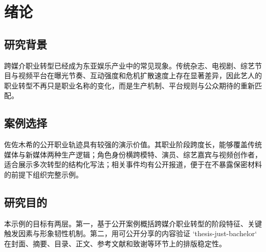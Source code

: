 \chapter{绪论}

\section{研究背景}

跨媒介职业转型已经成为东亚娱乐产业中的常见现象。传统杂志、电视剧、综艺节目与视频平台在曝光节奏、互动强度和危机扩散速度上存在显著差异，因此艺人的职业转型不再只是职业名称的变化，而是生产机制、平台规则与公众期待的重新匹配。

\section{案例选择}

佐佐木希的公开职业轨迹具有较强的演示价值。其职业阶段跨度长，能够覆盖传统媒体与新媒体两种生产逻辑；角色身份横跨模特、演员、综艺嘉宾与视频创作者，适合展示多次转型的结构化写法；相关事件均有公开报道，便于在不暴露保密材料的前提下组织完整示例。

\section{研究目的}

本示例的目标有两层。第一，基于公开案例概括跨媒介职业转型的阶段特征、关键触发因素与形象韧性机制。第二，用可公开分享的内容验证 `thesis-just-bachelor` 在封面、摘要、目录、正文、参考文献和致谢等环节上的排版稳定性。
